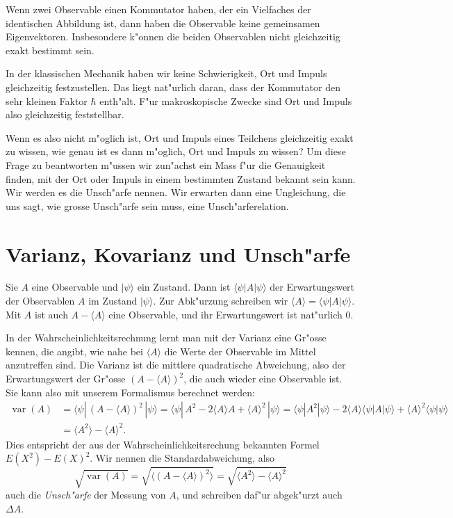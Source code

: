 \begin{satz}
Wenn zwei Observable einen Kommutator haben, der ein Vielfaches
der identischen Abbildung ist, dann haben die Observable keine
gemeinsamen Eigenvektoren.
Insbesondere k"onnen die beiden Observablen nicht gleichzeitig 
exakt bestimmt sein.
\end{satz}

In der klassischen Mechanik haben wir keine Schwierigkeit, Ort und
Impuls gleichzeitig festzustellen. Das liegt nat"urlich daran, dass
der Kommutator den sehr kleinen Faktor $\hbar$ enth"alt.
F"ur makroskopische Zwecke sind Ort und Impuls also gleichzeitig 
feststellbar.

Wenn es also nicht m"oglich ist, Ort und Impuls eines Teilchens
gleichzeitig exakt zu wissen, wie genau ist es dann m"oglich,
Ort und Impuls zu wissen?
Um diese Frage zu beantworten m"ussen wir zun"achst ein Mass f"ur
die Genauigkeit finden, mit der Ort oder Impuls in einem bestimmten
Zustand bekannt sein kann.
Wir werden es die Unsch"arfe nennen.
Wir erwarten dann eine Ungleichung, die uns sagt, wie grosse 
Unsch"arfe sein muss, eine Unsch"arferelation.


\section{Varianz, Kovarianz und Unsch"arfe}
Sie $A$ eine Observable und $|\psi\rangle$ ein Zustand. Dann ist
$\langle \psi|A|\psi\rangle$ der Erwartungswert der Observablen $A$ 
im Zustand $|\psi\rangle$.
Zur Abk"urzung schreiben wir $\langle A\rangle=\langle\psi|A|\psi\rangle$.
Mit $A$ ist auch $A-\langle A\rangle$ eine Observable, und ihr Erwartungswert
ist nat"urlich $0$.

In der Wahrscheinlichkeitsrechnung lernt man mit der Varianz eine
Gr"osse kennen, die angibt, wie nahe bei $\langle A\rangle$ die
Werte der Observable im Mittel anzutreffen sind.
Die Varianz ist die mittlere quadratische Abweichung, also der
Erwartungswert der Gr"osse $(A-\langle A\rangle)^2$, die auch wieder
eine Observable ist. Sie kann also mit unserem Formalismus berechnet
werden:
\begin{align*}
\operatorname{var}(A)
&=
\langle \psi|\, (A-\langle A\rangle)^2\,|\psi\rangle
=
\langle\psi|\, A^2-2\langle A\rangle A+\langle A\rangle^2\,|\psi\rangle
=
\langle\psi|A^2|\psi\rangle 
-2\langle A\rangle \langle\psi|A|\psi\rangle
+\langle A\rangle^2\langle\psi|\psi\rangle
\\
&=\langle A^2\rangle -\langle A\rangle^2.
\end{align*}
Dies entspricht der aus der Wahrscheinlichkeitsrechung bekannten Formel
$E(X^2)-E(X)^2$.
Wir nennen die Standardabweichung, also
\[
\sqrt{\operatorname{var}(A)}
=
\sqrt{\langle (A-\langle A\rangle)^2\rangle}
=
\sqrt{\langle A^2\rangle - \langle A\rangle^2}
\]
auch die {\em Unsch"arfe} der Messung von $A$, und schreiben daf"ur abgek"urzt
auch $\Delta A$.

